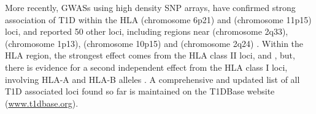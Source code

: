 More recently, \Glspl{GWAS} using high density \gls{SNP} arrays,
have confirmed strong association of T1D within the \gls{HLA} (chromosome 6p21) and  (chromosome 11p15) loci,
and reported 50 other loci, including regions near
 (chromosome 2q33),  (chromosome 1p13),  (chromosome 10p15)
and  (chromosome 2q24) \citep{Nejentsev:2007dv,Burton:2007hta,Barrett:2009jq}.
Within the HLA region, the strongest effect comes from the HLA class II loci,  and ,
but, there is evidence for a second independent effect from the HLA class I loci,
involving HLA-A and HLA-B alleles \citep{Nejentsev:2007dv,Howson:2009bl}. 
A comprehensive and updated list of all T1D associated loci found so far is maintained on the T1DBase website (\url{www.t1dbase.org}).







